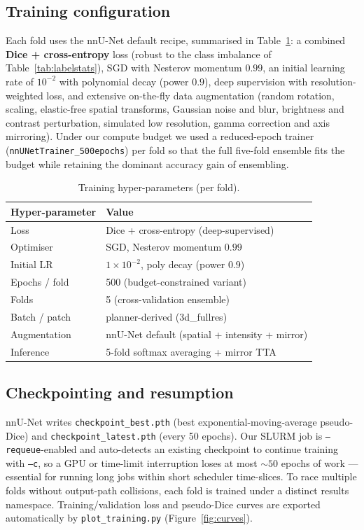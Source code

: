 \documentclass[11pt,a4paper]{article}
\begin{document}
\subsection{Training configuration}
Each fold uses the nnU-Net default recipe, summarised in Table~\ref{tab:train}:
a combined \textbf{Dice + cross-entropy} loss (robust to the class imbalance of
Table~\ref{tab:labelstats}), SGD with Nesterov momentum $0.99$, an initial learning
rate of $10^{-2}$ with polynomial decay (power $0.9$), deep supervision with
resolution-weighted loss, and extensive on-the-fly data augmentation (random
rotation, scaling, elastic-free spatial transforms, Gaussian noise and blur,
brightness and contrast perturbation, simulated low resolution, gamma correction and
axis mirroring). Under our compute budget we used a reduced-epoch trainer
(\texttt{nnUNetTrainer\_500epochs}) per fold so that the full five-fold ensemble fits
the budget while retaining the dominant accuracy gain of ensembling.

\begin{table}[h]
\centering
\caption{Training hyper-parameters (per fold).}
\label{tab:train}
\begin{tabular}{ll}
\toprule
Hyper-parameter & Value \\
\midrule
Loss               & Dice + cross-entropy (deep-supervised) \\
Optimiser          & SGD, Nesterov momentum $0.99$ \\
Initial LR         & $1\times10^{-2}$, poly decay (power $0.9$) \\
Epochs / fold      & 500 (budget-constrained variant) \\
Folds              & 5 (cross-validation ensemble) \\
Batch / patch      & planner-derived (3d\_fullres) \\
Augmentation       & nnU-Net default (spatial + intensity + mirror) \\
Inference          & 5-fold softmax averaging + mirror TTA \\
\bottomrule
\end{tabular}
\end{table}

\subsection{Checkpointing and resumption}
nnU-Net writes \texttt{checkpoint\_best.pth} (best exponential-moving-average
pseudo-Dice) and \texttt{checkpoint\_latest.pth} (every 50 epochs). Our SLURM job is
\texttt{--requeue}-enabled and auto-detects an existing checkpoint to continue
training with \texttt{--c}, so a GPU or time-limit interruption loses at most
$\sim\!50$ epochs of work --- essential for running long jobs within short scheduler
time-slices. To race multiple folds without output-path collisions, each fold is
trained under a distinct results namespace. Training/validation loss and pseudo-Dice
curves are exported automatically by \texttt{plot\_training.py}
(Figure~\ref{fig:curves}).
\end{document}
